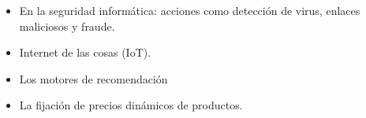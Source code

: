 \documentclass[t,compress,10pt,xcolor=dvipsnames]{beamer}
\begin{document}
{\begin{itemize}
		\framebreak	
				
		\item En la seguridad inform\'atica: acciones como detecci\'on de virus, enlaces maliciosos y fraude. 
		\item Internet de las cosas (IoT).
		
		\item Los motores de recomendaci\'on 
		\item La fijaci\'on de precios din\'amicos de productos.
		
		\end{itemize}
	}

%
\end{document}
